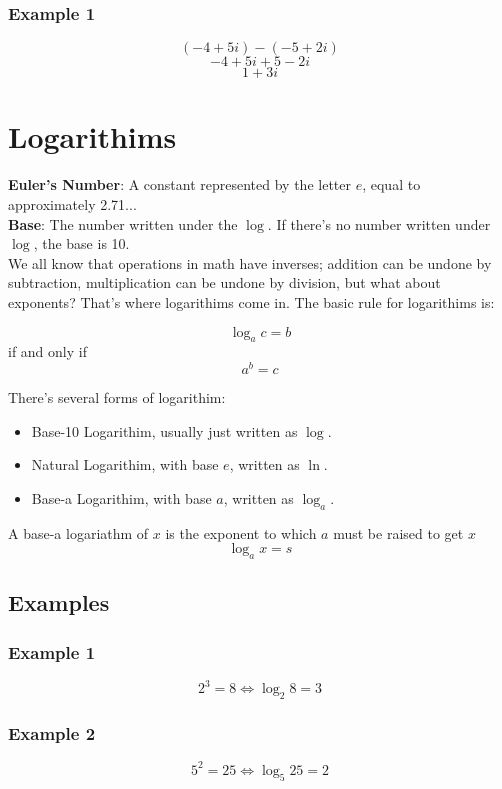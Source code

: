 \documentclass{article}
\begin{document}
\subsubsection{Example 1}
$$(-4 + 5i) - (-5 + 2i)$$
$$-4 + 5i + 5 - 2i$$
$$1 + 3i$$

\section{Logarithims}
\textbf{Euler's Number}: A constant represented by the letter $e$, equal to approximately 2.71... \\
\textbf{Base}: The number written under the $\log$. If there's no number written under $\log$, the base is 10. \\

\noindent We all know that operations in math have inverses; addition can be undone by subtraction, multiplication can be undone by division, but what about exponents? That's where logarithims come in. The basic rule for logarithims is: 

\begin{center}
	$$\log_a c = b$$ 
	if and only if 
	$$a^b = c$$
\end{center}

There's several forms of logarithim: 
\begin{itemize}
	\item Base-10 Logarithim, usually just written as $\log$.
	\item Natural Logarithim, with base $e$, written as $\ln$.
	\item Base-a Logarithim, with base $a$, written as $\log_a$.
\end{itemize}

A base-a logariathm of $x$ is the exponent to which $a$ must be raised to get $x$
$$\log_a x = s$$

\subsection{Examples}
\subsubsection{Example 1}
$$2^3 = 8 \Leftrightarrow \log_2 8 = 3$$

\subsubsection{Example 2}
$$5^2 = 25 \Leftrightarrow \log_5 25 = 2$$
\end{document}
